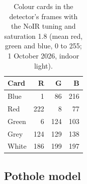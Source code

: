 \begin{table}[htbp]
\centering
\caption[Colour cards in the detector's frames with the NoIR tuning and saturation 1.8 (mean red, green and blue, 0 to 255; 1 October 2026, indoor light)]{Colour cards in the detector's frames with the NoIR tuning and saturation 1.8 (mean red, green and blue, 0 to 255; 1 October 2026, indoor light).}
\label{tab:colour-cards}
\begin{tabular}{lrrr}
\hline
Card & R & G & B \\
\hline
Blue & 1 & 86 & 216 \\
Red & 222 & 8 & 77 \\
Green & 6 & 124 & 103 \\
Grey & 124 & 129 & 138 \\
White & 186 & 199 & 197 \\
\hline
\end{tabular}
\end{table}

\subsection*{Pothole model}

